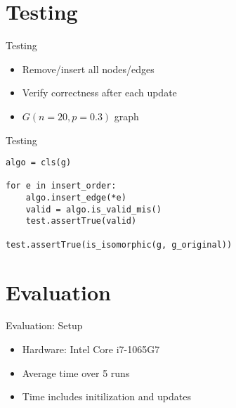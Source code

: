 \documentclass{beamer}
\begin{document}
\section{Testing}
\begin{frame}{Testing}
  \begin{itemize}
    \item Remove/insert all nodes/edges
    \item Verify correctness after each update
    \item $G(n=20, p=0.3)$ graph
  \end{itemize}
\end{frame}

\begin{frame}[fragile]{Testing}
  \begin{lstlisting}[caption=Testing Snippet (Modified)]
algo = cls(g)

for e in insert_order:
    algo.insert_edge(*e)
    valid = algo.is_valid_mis()
    test.assertTrue(valid)

test.assertTrue(is_isomorphic(g, g_original))
  \end{lstlisting}
\end{frame}

\section{Evaluation}

\begin{frame}{Evaluation: Setup}
  \begin{itemize}
    \item Hardware: Intel Core i7-1065G7
    \item Average time over 5 runs
    \item Time includes initilization and updates
      \bigskip
  \end{itemize}
\end{frame}
\end{document}
